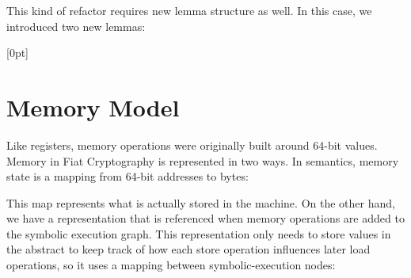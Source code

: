 This kind of refactor requires new lemma structure as well.
In this case, we introduced two new lemmas:


[0pt]


\section{Memory Model}
\label{sec:mem-model}

Like registers, memory operations were originally built around 64-bit values.
Memory in Fiat Cryptography is represented in two ways.
In semantics, memory state is a mapping from 64-bit addresses to bytes:


This map represents what is actually stored in the machine.
On the other hand, we have a representation that is referenced when memory operations are added to the symbolic execution graph.
This representation only needs to store values in the abstract to keep track of how each store operation influences later load operations, so it uses a mapping between symbolic-execution nodes:

